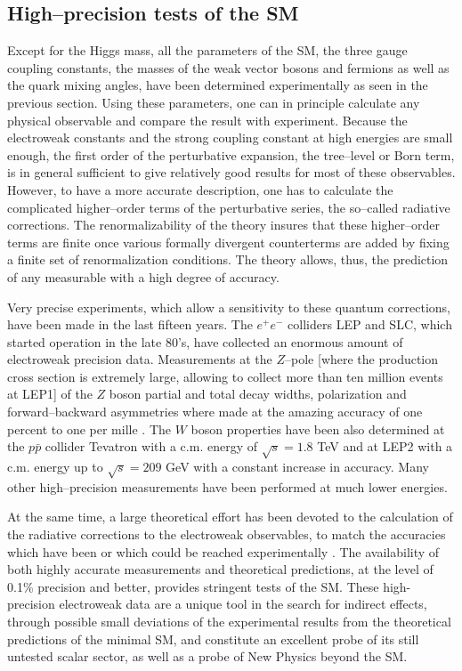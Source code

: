 \subsection{High--precision tests of the SM}

Except for the Higgs mass, all the parameters of the SM, the three gauge
coupling constants, the masses of the weak vector bosons and fermions as well
as the quark mixing angles, have been determined experimentally as seen in the
previous section. Using these parameters, one can in principle calculate any
physical observable and compare the result with experiment.  Because the
electroweak constants and the strong coupling constant at high energies are
small enough, the first order of the perturbative expansion, the tree--level or
Born term, is in general sufficient to give relatively good results for most of
these observables. However, to have a more accurate description, one has to
calculate the complicated higher--order terms of the perturbative series, the
so--called radiative corrections. The renormalizability of the theory insures
that these higher--order terms are finite once various formally divergent
counterterms are added by fixing a finite set of renormalization conditions. 
The theory allows, thus, the prediction of any measurable with a high degree of
accuracy.\s

Very precise experiments, which allow a sensitivity to these quantum
corrections, have been made in the last fifteen years. The $e^+ e^-$ colliders
LEP and SLC, which started operation in the late 80's, have collected an
enormous amount of electroweak precision data.  Measurements at the $Z$--pole
[where the production cross section is  extremely large, allowing to collect
more than ten million events at LEP1] of the $Z$ boson partial and total decay
widths, polarization and forward--backward asymmetries where made at the
amazing accuracy of one percent to one per mille \cite{High-Precision}. The $W$
boson properties have  been also determined at the $p \bar{p}$ collider
Tevatron with a c.m. energy  of $\sqrt{s}=1.8$ TeV \cite{MW-Tevatron} and at
LEP2 with a c.m.  energy up to $\sqrt{s}=209$ GeV \cite{MW-LEP2} with a
constant increase in accuracy. Many other high--precision measurements have
been performed at much lower energies.\s

At the same time, a large theoretical effort has been devoted to the
calculation of the radiative  corrections to the electroweak  observables, to
match the accuracies which have been or which could be reached experimentally
\cite{Z-Physics,Z-Precision,W-Physics,Z-Physics-H}.  The availability of both
highly accurate measurements and theoretical predictions, at the level of 0.1\%
precision and better, provides stringent tests of the SM. These high-precision
electroweak data are a unique tool in the search for indirect effects, through
possible small deviations of the experimental results from the theoretical
predictions of the minimal SM, and constitute an excellent probe of its still
untested scalar sector, as well as a probe of New Physics beyond the SM.\s


